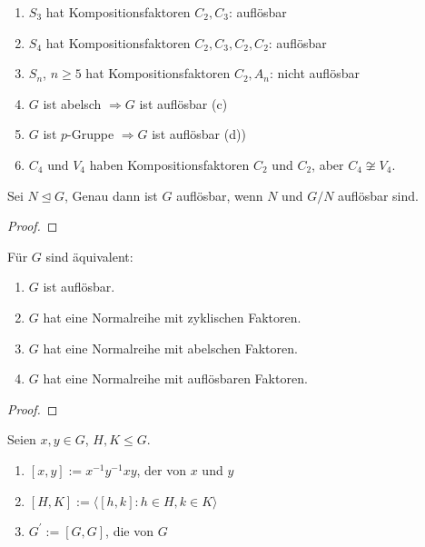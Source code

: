 \begin{example}
	\begin{enumerate}[label=(\alph*)]
		\item $S_3$ hat Kompositionsfaktoren $C_2, C_3$: auflösbar
		\item $S_4$ hat Kompositionsfaktoren $C_2,C_3,C_2,C_2$: auflösbar
		\item $S_n$, $n \geq 5$ hat Kompositionsfaktoren $C_2, A_n$: nicht auflösbar
		\item $G$ ist abelsch $\Longrightarrow G$ ist auflösbar (c)
		\item $G$ ist $p$-Gruppe $\Longrightarrow G$ ist auflösbar (d))
		\item $C_4 \text{ und } V_4$ haben Kompositionsfaktoren $C_2$ und $C_2$, aber $C_4 \not\cong V_4$.
	\end{enumerate}
\end{example}

\begin{lemma}
	Sei $N\unlhd G$, Genau dann ist $G$ auflösbar, wenn $N$ und $G/N$ auflösbar sind.
\end{lemma}

\begin{proof}
	
\end{proof}

\begin{proposition}
	Für $G$ sind äquivalent:
	\begin{enumerate}
		\item $G$ ist auflösbar.
		\item $G$ hat eine Normalreihe mit zyklischen Faktoren.
		\item $G$ hat eine Normalreihe mit abelschen Faktoren.
		\item $G$ hat eine Normalreihe mit auflösbaren Faktoren.
	\end{enumerate}
\end{proposition}

\begin{proof}
	
\end{proof}

\begin{definition}
	Seien $x,y \in G$, $H,K \leq G$.
	\begin{enumerate}
		\item $[x,y] := x^{-1}y^{-1}xy$, der  von $x$ und $y$
		\item $[H,K] := \langle[h,k]\colon h \in H, k\in K\rangle$
		\item $G^{'} := [G,G]$, die  von $G$
	\end{enumerate}
\end{definition}

